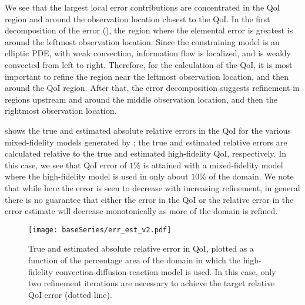 We see that the largest local error contributions are concentrated in the QoI region and around the observation location closest to the QoI. In the first decomposition of the error (), the region where the elemental error is greatest is around the leftmost observation location. Since the constraining model is an elliptic PDE, with weak convection, information flow is localized, and is weakly convected from left to right. Therefore, for the calculation of the QoI, it is most important to refine the region near the leftmost observation location, and then around the QoI region. After that, the error decomposition suggests refinement in regions upstream and around the middle observation location, and then the rightmost observation location.

 shows the true and estimated absolute relative errors in the QoI for the various mixed-fidelity models generated by ; the true and estimated relative errors are calculated relative to the true and estimated high-fidelity QoI, respectively. In this case, we see that QoI error of $1\%$ is attained with a mixed-fidelity model where the high-fidelity model is used in only about $10\%$ of the domain. We note that while here the error is seen to decrease with increasing refinement, in general there is no guarantee that either the error in the QoI or the relative error in the error estimate will decrease monotonically as more of the domain is refined.
%
\begin{figure}[htbp]
\centering
\texttt{[image: baseSeries/err\_est\_v2.pdf]}
\caption{True and estimated absolute relative error in QoI, plotted as a function of the percentage area of the domain in which the high-fidelity convection-diffusion-reaction model is used. In this case, only two refinement iterations are necessary to achieve the target relative QoI error (dotted line).}
\label{fig:baseErr}
\end{figure}
%

